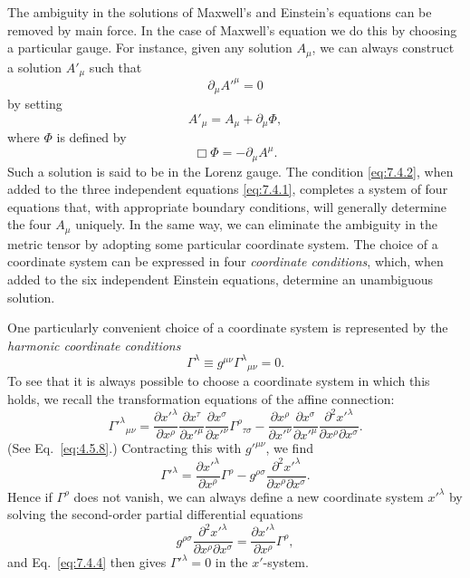 The ambiguity in the solutions of Maxwell's and Einstein's equations can be
removed by main force. In the case of Maxwell's equation we do this by
choosing a particular gauge. For instance, given any solution \(A_\mu\), we
can always construct a solution \(A'_\mu\) such that
\begin{equation}
  \partial_\mu A'^\mu=0
  \tag{7.4.2}\label{eq:7.4.2}
\end{equation}
by setting
\[
  A'_\mu=A_\mu+\partial_\mu\Phi,
\]
where \(\Phi\) is defined by
\[
  \Box\Phi=-\partial_\mu A^\mu.
\]
Such a solution is said to be in the Lorenz gauge. The condition
\eqref{eq:7.4.2}, when added to the three independent equations
\eqref{eq:7.4.1}, completes a system of four equations that, with appropriate
boundary conditions, will generally determine the four \(A_\mu\) uniquely.
In the same way, we can eliminate the ambiguity in the metric tensor by
adopting some particular coordinate system. The choice of a coordinate system
can be expressed in four \emph{coordinate conditions}, which, when added to
the six independent Einstein equations, determine an unambiguous solution.

One particularly convenient choice of a coordinate system is represented by
the \emph{harmonic coordinate conditions}
\begin{equation}
  \Gamma^\lambda
  \equiv
  g^{\mu\nu}\Gamma^\lambda{}_{\mu\nu}
  =
  0.
  \tag{7.4.3}\label{eq:7.4.3}
\end{equation}
To see that it is always possible to choose a coordinate system in which this
holds, we recall the transformation equations of the affine connection:
\[
  \Gamma'^\lambda{}_{\mu\nu}
  =
  \frac{\partial x'^\lambda}{\partial x^\rho}
  \frac{\partial x^\tau}{\partial x'^\mu}
  \frac{\partial x^\sigma}{\partial x'^\nu}
  \Gamma^\rho{}_{\tau\sigma}
  -
  \frac{\partial x^\rho}{\partial x'^\nu}
  \frac{\partial x^\sigma}{\partial x'^\mu}
  \frac{\partial^2x'^\lambda}
       {\partial x^\rho\partial x^\sigma}.
\]
(See Eq.~\eqref{eq:4.5.8}.) Contracting this with \(g'^{\mu\nu}\), we find
\begin{equation}
  \Gamma'^\lambda
  =
  \frac{\partial x'^\lambda}{\partial x^\rho}\Gamma^\rho
  -
  g^{\rho\sigma}
  \frac{\partial^2x'^\lambda}
       {\partial x^\rho\partial x^\sigma}.
  \tag{7.4.4}\label{eq:7.4.4}
\end{equation}
Hence if \(\Gamma^\rho\) does not vanish, we can always define a new
coordinate system \(x'^\lambda\) by solving the second-order partial
differential equations
\[
  g^{\rho\sigma}
  \frac{\partial^2x'^\lambda}
       {\partial x^\rho\partial x^\sigma}
  =
  \frac{\partial x'^\lambda}{\partial x^\rho}\Gamma^\rho,
\]
and Eq.~\eqref{eq:7.4.4} then gives \(\Gamma'^\lambda=0\) in the
\(x'\)-system.

